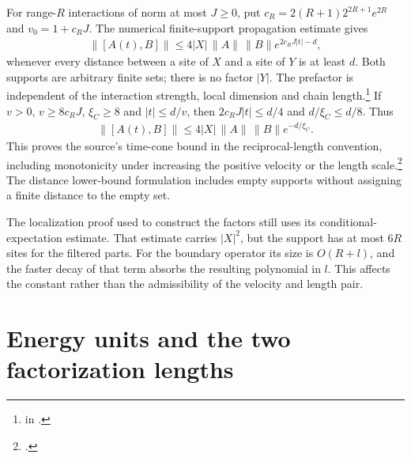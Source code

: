 \documentclass{article}
\begin{document}
For range-$R$ interactions of norm at most $J\ge0$, put
$c_R=2(R+1)2^{2R+1}e^{2R}$ and $v_0=1+c_RJ$.
The numerical finite-support propagation estimate gives
\begin{align}
    \|[A(t),B]\|\le4|X|\,\|A\|\,\|B\|
        e^{2c_RJ|t|-d},
    \label{eq:hastings07_lemma1_decay_length_chain}
\end{align}
whenever every distance between a site of $X$ and a site of $Y$ is at least
$d$. Both supports are arbitrary finite sets; there is no factor $|Y|$.
The prefactor is independent of the interaction strength, local dimension
and chain length.\footnote{
    in .}
If $v>0$, $v\ge8c_RJ$, $\xi_C\ge8$ and $|t|\le d/v$, then
$2c_RJ|t|\le d/4$ and $d/\xi_C\le d/8$. Thus
\begin{align}
    \|[A(t),B]\|\le4|X|\,\|A\|\,\|B\|e^{-d/\xi_C}.
    \label{eq:hastings07_lemma1_decay_length_cone}
\end{align}
This proves the source's time-cone bound in the reciprocal-length
convention, including monotonicity under increasing the positive velocity
or the length scale.\footnote{.}
The distance lower-bound formulation includes empty supports without
assigning a finite distance to the empty set.

The localization proof used to construct the factors still uses its
conditional-expectation estimate. That estimate carries $|X|^2$, but the
support has at most $6R$ sites for the filtered parts. For the boundary
operator its size is $O(R+l)$, and the faster decay of that term absorbs
the resulting polynomial in $l$. This affects the constant rather than the
admissibility of the velocity and length pair.

\section{Energy units and the two factorization lengths}
\end{document}
